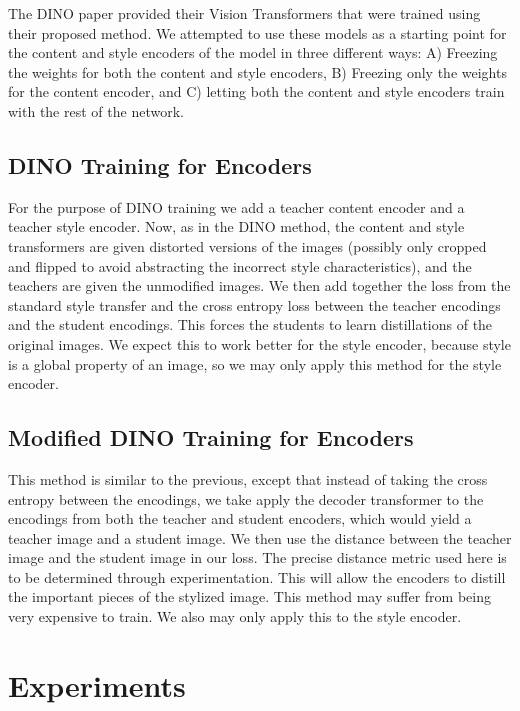 \documentclass{article}
\begin{document}
The DINO paper provided their Vision Transformers that were trained using their proposed method. We attempted to use these models as a starting point for the content and style encoders of the model in three different ways: A) Freezing the weights for both the content and style encoders, B) Freezing only the weights for the content encoder, and C) letting both the content and style encoders train with the rest of the network.


\subsection{DINO Training for Encoders}

For the purpose of DINO training we add a teacher content encoder and a teacher style encoder. Now, as in the DINO method, the content and style transformers are given distorted versions of the images (possibly only cropped and flipped to avoid abstracting the incorrect style characteristics), and the teachers are given the unmodified images. We then add together the loss from the standard style transfer and the cross entropy loss between the teacher encodings and the student encodings. This forces the students to learn distillations of the original images. We expect this to work better for the style encoder, because style is a global property of an image, so we may only apply this method for the style encoder.

\subsection{Modified DINO Training for Encoders}

This method is similar to the previous, except that instead of taking the cross entropy between the encodings, we take apply the decoder transformer to the encodings from both the teacher and student encoders, which would yield a teacher image and a student image. We then use the distance between the teacher image and the student image in our loss. The precise distance metric used here is to be determined through experimentation. This will allow the encoders to distill the important pieces of the stylized image. This method may suffer from being very expensive to train. We also may only apply this to the style encoder.

\section{Experiments}
\end{document}
